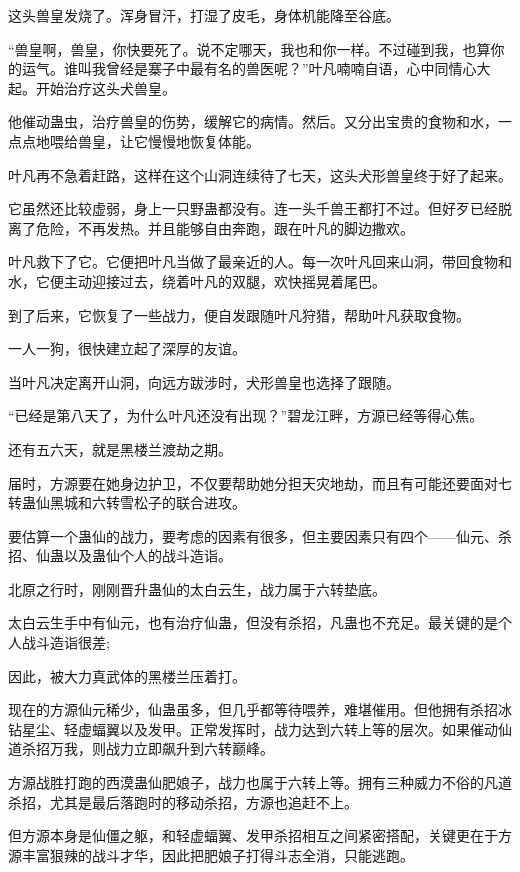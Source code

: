 \begin{this_body}
这头兽皇发烧了。浑身冒汗，打湿了皮毛，身体机能降至谷底。

“兽皇啊，兽皇，你快要死了。说不定哪天，我也和你一样。不过碰到我，也算你的运气。谁叫我曾经是寨子中最有名的兽医呢？”叶凡喃喃自语，心中同情心大起。开始治疗这头犬兽皇。

他催动蛊虫，治疗兽皇的伤势，缓解它的病情。然后。又分出宝贵的食物和水，一点点地喂给兽皇，让它慢慢地恢复体能。

叶凡再不急着赶路，这样在这个山洞连续待了七天，这头犬形兽皇终于好了起来。

它虽然还比较虚弱，身上一只野蛊都没有。连一头千兽王都打不过。但好歹已经脱离了危险，不再发热。并且能够自由奔跑，跟在叶凡的脚边撒欢。

叶凡救下了它。它便把叶凡当做了最亲近的人。每一次叶凡回来山洞，带回食物和水，它便主动迎接过去，绕着叶凡的双腿，欢快摇晃着尾巴。

到了后来，它恢复了一些战力，便自发跟随叶凡狩猎，帮助叶凡获取食物。

一人一狗，很快建立起了深厚的友谊。

当叶凡决定离开山洞，向远方跋涉时，犬形兽皇也选择了跟随。

“已经是第八天了，为什么叶凡还没有出现？”碧龙江畔，方源已经等得心焦。

还有五六天，就是黑楼兰渡劫之期。

届时，方源要在她身边护卫，不仅要帮助她分担天灾地劫，而且有可能还要面对七转蛊仙黑城和六转雪松子的联合进攻。

要估算一个蛊仙的战力，要考虑的因素有很多，但主要因素只有四个——仙元、杀招、仙蛊以及蛊仙个人的战斗造诣。

北原之行时，刚刚晋升蛊仙的太白云生，战力属于六转垫底。

太白云生手中有仙元，也有治疗仙蛊，但没有杀招，凡蛊也不充足。最关键的是个人战斗造诣很差;

因此，被大力真武体的黑楼兰压着打。

现在的方源仙元稀少，仙蛊虽多，但几乎都等待喂养，难堪催用。但他拥有杀招冰钻星尘、轻虚蝠翼以及发甲。正常发挥时，战力达到六转上等的层次。如果催动仙道杀招万我，则战力立即飙升到六转巅峰。

方源战胜打跑的西漠蛊仙肥娘子，战力也属于六转上等。拥有三种威力不俗的凡道杀招，尤其是最后落跑时的移动杀招，方源也追赶不上。

但方源本身是仙僵之躯，和轻虚蝠翼、发甲杀招相互之间紧密搭配，关键更在于方源丰富狠辣的战斗才华，因此把肥娘子打得斗志全消，只能逃跑。


\end{this_body}
